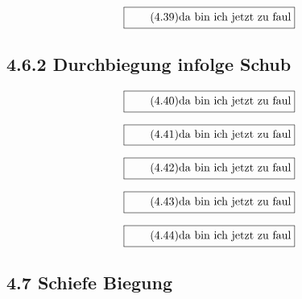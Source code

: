 \documentclass[11pt]{article}
\newcommand{\1}{ {\mathds{1}} }
\begin{document}
    \begin{equation}
      \boxed{
        \tag{4.39}
        \begin{split}
          \text{da bin ich jetzt zu faul}
        \end{split}
      }
    \end{equation}
    
    \subsection*{4.6.2 Durchbiegung infolge Schub}

    \begin{equation}
      \boxed{
        \tag{4.40}
        \begin{split}
          \text{da bin ich jetzt zu faul}
        \end{split}
      }
    \end{equation}

    \begin{equation}
      \boxed{
        \tag{4.41}
        \begin{split}
          \text{da bin ich jetzt zu faul}
        \end{split}
      }
    \end{equation}

    \begin{equation}
      \boxed{
        \tag{4.42}
        \begin{split}
          \text{da bin ich jetzt zu faul}
        \end{split}
      }
    \end{equation}

    \begin{equation}
      \boxed{
        \tag{4.43}
        \begin{split}
          \text{da bin ich jetzt zu faul}
        \end{split}
      }
    \end{equation}
    
    \begin{equation}
      \boxed{
        \tag{4.44}
        \begin{split}
          \text{da bin ich jetzt zu faul}
        \end{split}
      }
    \end{equation}

    \subsection*{4.7 Schiefe Biegung}
\end{document}
